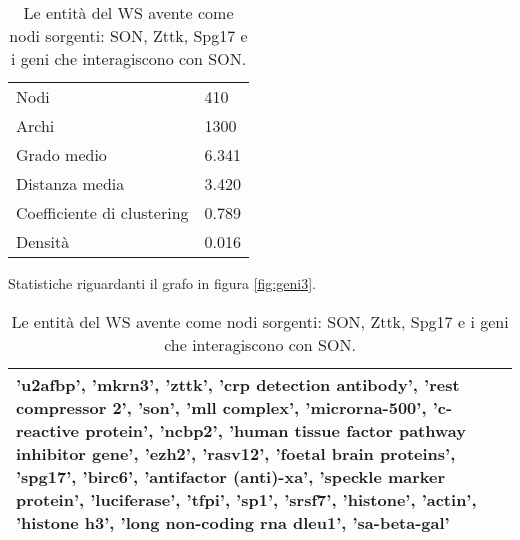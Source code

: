 \documentclass[12pt]{report}
\begin{document}
\begin{table}[htb]
\parbox{.45\linewidth}{
\centering
\begin{tabular}{|l|l|}
    \hline
    \small{Nodi} & \small{410}	\\
    \small{Archi} &	\small{1300}\\
    \small{Grado medio} & \small{6.341} 	\\
    \small{Distanza media} & \small{3.420}	\\
    \small{Coefficiente di clustering} & \small{0.789}	\\
    \small{Densità} &	\small{0.016}\\
    \hline
    \end{tabular}
    \caption{\footnotesize{Statistiche riguardanti il grafo in figura \ref{fig:geni3}.}}
    \label{tab:geni3_stat}
}
\hfill
\parbox{.45\linewidth}{
\centering
    \begin{tabularx}{\linewidth}{|X|}
    \hline
    \scriptsize{'u2afbp', 'mkrn3', 'zttk', 'crp detection antibody', 'rest compressor 2', 'son', 'mll complex', 'microrna-500', 'c-reactive protein', 'ncbp2', 'human tissue factor pathway inhibitor gene', 'ezh2', 'rasv12', 'foetal brain proteins', 'spg17', 'birc6', 'antifactor (anti)-xa', 'speckle marker protein', 'luciferase', 'tfpi', 'sp1', 'srsf7', 'histone', 'actin', 'histone h3', 'long non-coding rna dleu1', 'sa-beta-gal'}\\
    \hline
    \end{tabularx}
    \caption{\footnotesize{Le entità del WS avente come nodi sorgenti: SON, Zttk, Spg17 e i geni che interagiscono con SON.}}
    \label{tab:WS_geni}
}
\end{table}
\end{document}
